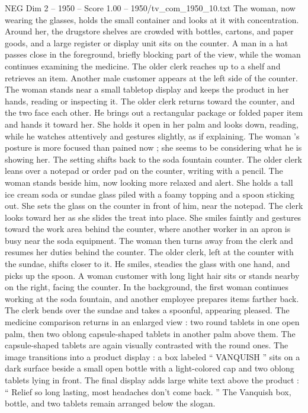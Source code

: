 \begin{textsample}{NEG Dim 2 – 1950 – Score 1.00 – 1950/tv\_com\_1950\_10.txt}
The woman, now wearing the glasses, holds the small container and looks at it with concentration.
Around her, the drugstore shelves are crowded with bottles, cartons, and paper goods, and a large register or display unit sits on the counter.
A man in a hat passes close in the foreground, briefly blocking part of the view, while the woman continues examining the medicine.
The older clerk reaches up to a shelf and retrieves an item.
Another male customer appears at the left side of the counter.
The woman stands near a small tabletop display and keeps the product in her hands, reading or inspecting it.
The older clerk returns toward the counter, and the two face each other.
He brings out a rectangular package or folded paper item and hands it toward her.
She holds it open in her palm and looks down, reading, while he watches attentively and gestures slightly, as if explaining.
The woman ’s posture is more focused than pained now ; she seems to be considering what he is showing her.
The setting shifts back to the soda fountain counter.
The older clerk leans over a notepad or order pad on the counter, writing with a pencil.
The woman stands beside him, now looking more relaxed and alert.
She holds a tall ice cream soda or sundae glass piled with a foamy topping and a spoon sticking out.
She sets the glass on the counter in front of him, near the notepad.
The clerk looks toward her as she slides the treat into place.
She smiles faintly and gestures toward the work area behind the counter, where another worker in an apron is busy near the soda equipment.
The woman then turns away from the clerk and resumes her duties behind the counter.
The older clerk, left at the counter with the sundae, shifts closer to it.
He smiles, steadies the glass with one hand, and picks up the spoon.
A woman customer with long light hair sits or stands nearby on the right, facing the counter.
In the background, the first woman continues working at the soda fountain, and another employee prepares items farther back.
The clerk bends over the sundae and takes a spoonful, appearing pleased.
The medicine comparison returns in an enlarged view : two round tablets in one open palm, then two oblong capsule-shaped tablets in another palm above them.
The capsule-shaped tablets are again visually contrasted with the round ones.
The image transitions into a product display : a box labeled “ VANQUISH ” sits on a dark surface beside a small open bottle with a light-colored cap and two oblong tablets lying in front.
The final display adds large white text above the product : “ Relief so long lasting, most headaches don't come back. ” The Vanquish box, bottle, and two tablets remain arranged below the slogan.

\end{textsample}
